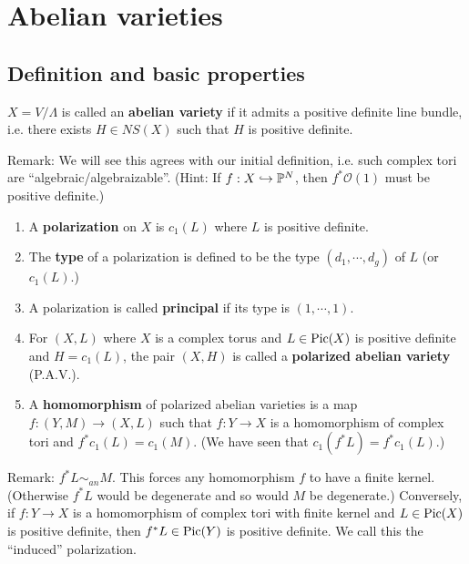 



\section{Abelian varieties}\label{Chapters/3-abelianvarieties}

\subsection{Definition and basic properties}

\begin{definition}
$X=V/\Lambda$ is called an \textbf{abelian variety} if it admits a positive definite line bundle, i.e. there exists $H\in NS(X)$ such that $H$ is positive definite. 
\end{definition}

Remark: We will see this agrees with our initial definition, i.e. such complex tori are ``algebraic/algebraizable''. (Hint: If $f:X\hookrightarrow {\mathbb P}^N$, then $f^*\mathcal{O}(1)$ must be positive definite.)

\begin{definition}
\noindent
\begin{enumerate}
\item A \textbf{polarization} on $X$ is $c_1(L)$ where $L$ is positive definite.
\item The \textbf{type} of a polarization is defined to be the type $(d_1,\cdots, d_g)$ of $L$ (or $c_1(L)$.)
\item A polarization is called \textbf{principal} if its type is $(1,\cdots, 1)$. 
\item For $(X,L)$ where $X$ is a complex torus and $L\in \operatorname{Pic}(X)$ is positive definite and $H=c_1(L)$, the pair $(X,H)$ is called a \textbf{polarized abelian variety} (P.A.V.).
\item A \textbf{homomorphism} of polarized abelian varieties is a map $f:(Y,M)\to (X,L)$ such that $f:Y\to X$ is a homomorphism of complex tori and $f^* c_1(L)=c_1(M)$. (We have seen that $c_1(f^*L)=f^* c_1(L)$.)
\end{enumerate}
\end{definition}

Remark: 
$f^*L\sim_{an} M$. This forces any homomorphism $f$ to have a finite kernel. (Otherwise $f^*L$ would be degenerate and so would $M$ be degenerate.) Conversely, if $f:Y\to X$ is a homomorphism of complex tori with finite kernel and $L\in \operatorname{Pic}(X)$ is positive definite, then $f^*L\in \operatorname{Pic}(Y)$ is positive definite. We call this the ``induced'' polarization. 

